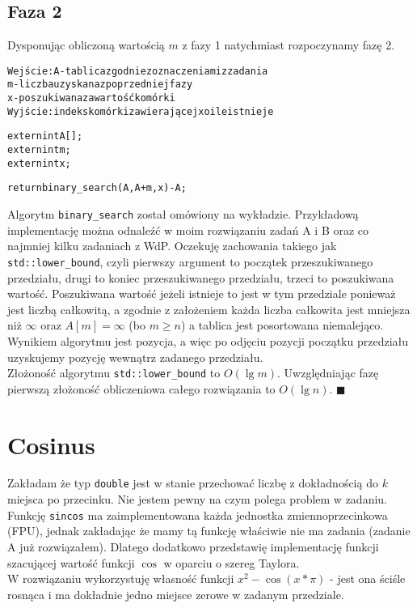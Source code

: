 \documentclass[a4paper,12pt]{article}
\begin{document}
\subsection*{Faza 2}
Dysponując obliczoną wartością $m$ z fazy 1 natychmiast rozpoczynamy fazę 2.
\begin{alltt}
 Wejście: A - tablica zgodnie z oznaczeniami z zadania
          m - liczba uzyskana z poprzedniej fazy
          x - poszukiwana zawartość komórki
 Wyjście: indeks komórki zawierającej x o ile istnieje
 
 extern int A[];
 extern int m;
 extern int x;
 
 return binary_search(A,A+m,x)-A;
\end{alltt}
Algorytm \verb|binary_search| został omówiony na wykładzie. Przykładową implementację można odnaleźć w moim rozwiązaniu zadań A i B oraz co najmniej kilku zadaniach z WdP.
Oczekuję zachowania takiego jak\\
\verb|std::lower_bound|, czyli pierwszy argument to początek przeszukiwanego przedziału, drugi to koniec przeszukiwanego przedziału, trzeci to poszukiwana wartość. Poszukiwana wartość jeżeli istnieje to jest w tym przedziale ponieważ jest liczbą całkowitą, a zgodnie z założeniem każda liczba całkowita jest mniejsza niż $\infty$ oraz $A[m]=\infty$ (bo $m\geq{n}$) a tablica jest posortowana niemalejąco. Wynikiem algorytmu jest pozycja, a więc po odjęciu pozycji początku przedziału uzyskujemy pozycję wewnątrz zadanego przedziału.\\
Złożoność algorytmu \verb|std::lower_bound| to $O(\lg{m})$. Uwzględniając fazę\\
pierwszą złożoność obliczeniowa całego rozwiązania to $O(\lg{n})$. $\blacksquare$

\section{Cosinus}
Zakładam że typ \verb|double| jest w stanie przechować liczbę z dokładnością do $k$ miejsca po przecinku. Nie jestem pewny na czym polega problem w zadaniu. Funkcję \verb|sincos| ma zaimplementowana każda jednostka zmiennoprzecinkowa (FPU), jednak zakładając że mamy tą funkcję właściwie nie ma zadania (zadanie A już rozwiązałem). Dlatego dodatkowo przedstawię implementację funkcji szacującej wartość funkcji $\cos$ w oparciu o szereg Taylora.\\
W rozwiązaniu wykorzystuję własność funkcji $x^2-\cos(x*\pi)$ - jest ona ściśle rosnąca i ma dokładnie jedno miejsce zerowe w zadanym przedziale.
\end{document}
